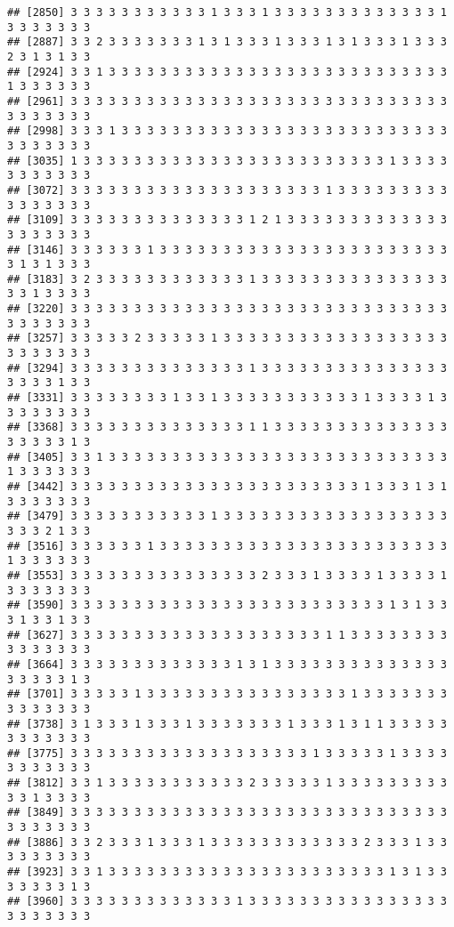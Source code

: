 \documentclass[
]{article}
\begin{document}
\begin{verbatim}
## [2850] 3 3 3 3 3 3 3 3 3 3 3 1 3 3 3 1 3 3 3 3 3 3 3 3 3 3 3 3 3 1 3 3 3 3 3 3 3
## [2887] 3 3 2 3 3 3 3 3 3 3 1 3 1 3 3 3 1 3 3 3 1 3 1 3 3 3 1 3 3 3 2 3 1 3 1 3 3
## [2924] 3 3 1 3 3 3 3 3 3 3 3 3 3 3 3 3 3 3 3 3 3 3 3 3 3 3 3 3 3 3 1 3 3 3 3 3 3
## [2961] 3 3 3 3 3 3 3 3 3 3 3 3 3 3 3 3 3 3 3 3 3 3 3 3 3 3 3 3 3 3 3 3 3 3 3 3 3
## [2998] 3 3 3 1 3 3 3 3 3 3 3 3 3 3 3 3 3 3 3 3 3 3 3 3 3 3 3 3 3 3 3 3 3 3 3 3 3
## [3035] 1 3 3 3 3 3 3 3 3 3 3 3 3 3 3 3 3 3 3 3 3 3 3 3 3 1 3 3 3 3 3 3 3 3 3 3 3
## [3072] 3 3 3 3 3 3 3 3 3 3 3 3 3 3 3 3 3 3 3 3 1 3 3 3 3 3 3 3 3 3 3 3 3 3 3 3 3
## [3109] 3 3 3 3 3 3 3 3 3 3 3 3 3 3 1 2 1 3 3 3 3 3 3 3 3 3 3 3 3 3 3 3 3 3 3 3 3
## [3146] 3 3 3 3 3 3 1 3 3 3 3 3 3 3 3 3 3 3 3 3 3 3 3 3 3 3 3 3 3 3 3 1 3 1 3 3 3
## [3183] 3 2 3 3 3 3 3 3 3 3 3 3 3 3 1 3 3 3 3 3 3 3 3 3 3 3 3 3 3 3 3 3 1 3 3 3 3
## [3220] 3 3 3 3 3 3 3 3 3 3 3 3 3 3 3 3 3 3 3 3 3 3 3 3 3 3 3 3 3 3 3 3 3 3 3 3 3
## [3257] 3 3 3 3 3 2 3 3 3 3 3 1 3 3 3 3 3 3 3 3 3 3 3 3 3 3 3 3 3 3 3 3 3 3 3 3 3
## [3294] 3 3 3 3 3 3 3 3 3 3 3 3 3 3 1 3 3 3 3 3 3 3 3 3 3 3 3 3 3 3 3 3 3 3 1 3 3
## [3331] 3 3 3 3 3 3 3 3 1 3 3 1 3 3 3 3 3 3 3 3 3 3 3 1 3 3 3 3 1 3 3 3 3 3 3 3 3
## [3368] 3 3 3 3 3 3 3 3 3 3 3 3 3 3 1 1 3 3 3 3 3 3 3 3 3 3 3 3 3 3 3 3 3 3 3 1 3
## [3405] 3 3 1 3 3 3 3 3 3 3 3 3 3 3 3 3 3 3 3 3 3 3 3 3 3 3 3 3 3 3 1 3 3 3 3 3 3
## [3442] 3 3 3 3 3 3 3 3 3 3 3 3 3 3 3 3 3 3 3 3 3 3 3 1 3 3 3 1 3 1 3 3 3 3 3 3 3
## [3479] 3 3 3 3 3 3 3 3 3 3 3 1 3 3 3 3 3 3 3 3 3 3 3 3 3 3 3 3 3 3 3 3 3 2 1 3 3
## [3516] 3 3 3 3 3 3 1 3 3 3 3 3 3 3 3 3 3 3 3 3 3 3 3 3 3 3 3 3 3 3 1 3 3 3 3 3 3
## [3553] 3 3 3 3 3 3 3 3 3 3 3 3 3 3 3 2 3 3 3 1 3 3 3 3 1 3 3 3 3 1 3 3 3 3 3 3 3
## [3590] 3 3 3 3 3 3 3 3 3 3 3 3 3 3 3 3 3 3 3 3 3 3 3 3 3 1 3 1 3 3 3 1 3 3 1 3 3
## [3627] 3 3 3 3 3 3 3 3 3 3 3 3 3 3 3 3 3 3 3 3 1 1 3 3 3 3 3 3 3 3 3 3 3 3 3 3 3
## [3664] 3 3 3 3 3 3 3 3 3 3 3 3 3 1 3 1 3 3 3 3 3 3 3 3 3 3 3 3 3 3 3 3 3 3 3 1 3
## [3701] 3 3 3 3 3 1 3 3 3 3 3 3 3 3 3 3 3 3 3 3 3 3 1 3 3 3 3 3 3 3 3 3 3 3 3 3 3
## [3738] 3 1 3 3 3 1 3 3 3 1 3 3 3 3 3 3 3 1 3 3 3 1 3 1 1 3 3 3 3 3 3 3 3 3 3 3 3
## [3775] 3 3 3 3 3 3 3 3 3 3 3 3 3 3 3 3 3 3 3 1 3 3 3 3 3 1 3 3 3 3 3 3 3 3 3 3 3
## [3812] 3 3 1 3 3 3 3 3 3 3 3 3 3 3 2 3 3 3 3 3 1 3 3 3 3 3 3 3 3 3 3 3 1 3 3 3 3
## [3849] 3 3 3 3 3 3 3 3 3 3 3 3 3 3 3 3 3 3 3 3 3 3 3 3 3 3 3 3 3 3 3 3 3 3 3 3 3
## [3886] 3 3 2 3 3 3 1 3 3 3 1 3 3 3 3 3 3 3 3 3 3 3 3 2 3 3 3 1 3 3 3 3 3 3 3 3 3
## [3923] 3 3 1 3 3 3 3 3 3 3 3 3 3 3 3 3 3 3 3 3 3 3 3 3 3 1 3 1 3 3 3 3 3 3 3 1 3
## [3960] 3 3 3 3 3 3 3 3 3 3 3 3 3 1 3 3 3 3 3 3 3 3 3 3 3 3 3 3 3 3 3 3 3 3 3 3 3

\end{verbatim}
\end{document}
